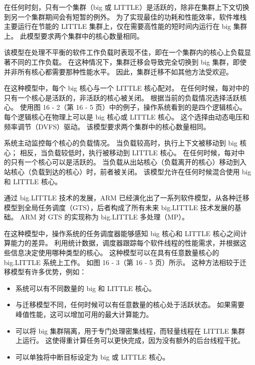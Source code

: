 
在任何时刻，只有一个集群（big 或 LITTLE）是活跃的，除非在集群上下文切换到另一个集群期间会有短暂的例外。
为了实现最佳的功耗和性能效率，软件堆栈主要运行在节能的 LITTLE 集群上，仅在需要高性能的短时间内运行在 big 集群上。
此模型要求两个集群中的核心数量相同。

该模型在处理不平衡的软件工作负载时表现不佳，即在一个集群内的核心上负载显著不同的工作负载。
在这种情况下，集群迁移会导致完全切换到 big 集群，即使并非所有核心都需要那种性能水平。
因此，集群迁移不如其他方法受欢迎。


在这种模型中，每个 big 核心与一个 LITTLE 核心配对。
在任何时候，每对中的只有一个核心是活跃的，非活跃的核心被关闭。
根据当前的负载情况选择活跃核心。
使用图 16 - 2（第 16 - 5 页）中的例子，操作系统看到的是四个逻辑核心。
每个逻辑核心在物理上可以是 big 核心或 LITTLE 核心。
这个选择由动态电压和频率调节（DVFS）驱动。
该模型要求两个集群中的核心数量相同。


系统主动监控每个核心的负载情况。
当负载较高时，执行上下文被移动到 big 核心；
相反，当负载较低时，执行被移动到 LITTLE 核心。
在任何时候，每对中的只有一个核心可以是活跃的。
当负载从出站核心（负载离开的核心）移动到入站核心（负载到达的核心）时，前者被关闭。
该模型允许在任何时候混合使用 big 和 LITTLE 核心。

\label{sec:global-task-sched}

通过 big.LITTLE 技术的发展，ARM 已经演化出了一系列软件模型，从各种迁移模型到全局任务调度（GTS），后者构成了所有未来 big.LITTLE 技术发展的基础。
ARM 对 GTS 的实现称为 big.LITTLE 多处理（MP）。

在这种模型中，操作系统的任务调度器能够感知 big 核心和 LITTLE 核心之间计算能力的差异。
利用统计数据，调度器跟踪每个软件线程的性能需求，并根据这些信息决定使用哪种类型的核心。
这种模型可以在具有任意数量核心的 big.LITTLE 系统上工作。
如图 16 - 3（第 16 - 5 页）所示。
这种方法相较于迁移模型有许多优势，例如：

\begin{itemize}
\item
  系统可以有不同数量的 big 和 LITTLE 核心。
\item
  与迁移模型不同，任何时候可以有任意数量的核心处于活跃状态。
  如果需要峰值性能，这可以增加可用的最大计算能力。
\item
  可以将 big 集群隔离，用于专门处理密集线程，而轻量线程在 LITTLE 集群上运行。
  这使得重计算任务可以更快完成，因为没有额外的后台线程干扰。
\item
  可以单独将中断目标设定为 big 或 LITTLE 核心。
\end{itemize}

